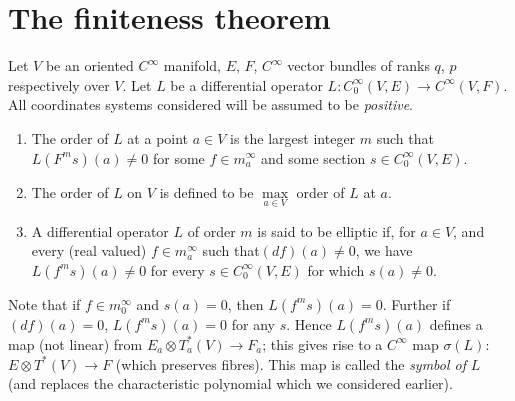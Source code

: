 \section{The finiteness theorem}\label{chap3:sec9} 

Let $V$ be an oriented $C^\infty$ manifold, $E$, $F$, $C^\infty$
vector bundles of ranks $q$, $p$ respectively over $V$. Let $L$ be a
differential operator $L: C^\infty_0 (V, E) \to C^\infty (V, F)$. All
coordinates systems considered will be assumed to be
\textit{positive}. 

\begin{defi*}
  \begin{enumerate}[(1)]
  \item The order of $L$ at a point $a \in V$ is the largest integer
    $m$ such that $L(F^m s) (a) \neq 0$ for some $f \in m^\infty_a$
    and some section $s \in C^\infty_0(V, E)$. 
  \item The order of $L$ on $V$ is defined to be $\max \limits_{a \in
    V}$ order of $L$ at $a$. 
  \item A differential operator $L$ of order $m$ is said to be
    elliptic if, for $a \in V$, and every (real valued) $f \in
    m^\infty_a$ such that\pageoriginale $(df) (a) \neq 0$, we have $L(f^m s) (a)
    \neq 0$ for every $s \in C^\infty_0 (V, E)$ for which $s(a) \neq
    0$. 
  \end{enumerate}
\end{defi*}

Note that if $f \in m^\infty_0$ and $s(a) = 0$, then $L(f^m s)(a) =
0$. Further if $(df)(a) = 0$, $L(f^m s) (a) = 0$ for any $s$. Hence
$L(f^m s)(a)$ defines a map (not linear) from $E_a \otimes T^*_a (V)
\to F_a$; this gives rise to a $C^\infty$ map $\sigma (L)$: $E \otimes
T^* (V) \to F$ (which preserves fibres). This map is called the
\textit{symbol of} $L$ (and replaces the characteristic polynomial
which we considered earlier). 

